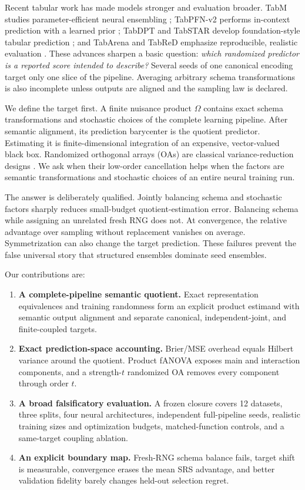 \documentclass{article}
\begin{document}
Recent tabular work has made models stronger and evaluation broader. TabM
studies parameter-efficient neural ensembling \citep{gorishniy2025tabm};
TabPFN-v2 performs in-context prediction with a learned prior
\citep{hollmann2025tabpfn}; TabDPT and TabSTAR develop foundation-style
tabular prediction \citep{ma2025tabdpt,arazi2025tabstar}; and TabArena and
TabReD emphasize reproducible, realistic evaluation
\citep{erickson2025tabarena,rubachev2025tabred}. These advances sharpen a
basic question: \emph{which randomized predictor is a reported score intended
to describe?} Several seeds of one canonical encoding target only one slice
of the pipeline. Averaging arbitrary schema transformations is also incomplete
unless outputs are aligned and the sampling law is declared.

We define the target first. A finite nuisance product $\Omega$ contains exact
schema transformations and stochastic choices of the complete learning
pipeline. After semantic alignment, its prediction barycenter is the quotient
predictor. Estimating it is finite-dimensional integration of an expensive,
vector-valued black box. Randomized orthogonal arrays (OAs) are classical
variance-reduction designs \citep{owen1992oa,ai2016oa}. We ask when their
low-order cancellation helps when the factors are semantic transformations
and stochastic choices of an entire neural training run.

The answer is deliberately qualified. Jointly balancing schema and stochastic
factors sharply reduces small-budget quotient-estimation error. Balancing
schema while assigning an unrelated fresh RNG does not. At convergence, the
relative advantage over sampling without replacement vanishes on average.
Symmetrization can also change the target prediction. These failures prevent
the false universal story that structured ensembles dominate seed ensembles.

Our contributions are:
\begin{enumerate}
  \item \textbf{A complete-pipeline semantic quotient.} Exact representation
  equivalences and training randomness form an explicit product estimand with
  semantic output alignment and separate canonical, independent-joint, and
  finite-coupled targets.
  \item \textbf{Exact prediction-space accounting.} Brier/MSE overhead equals
  Hilbert variance around the quotient. Product fANOVA exposes main and
  interaction components, and a strength-$t$ randomized OA removes every
  component through order $t$.
  \item \textbf{A broad falsificatory evaluation.} A frozen closure covers 12
  datasets, three splits, four neural architectures, independent
  full-pipeline seeds, realistic training sizes and optimization budgets,
  matched-function controls, and a same-target coupling ablation.
  \item \textbf{An explicit boundary map.} Fresh-RNG schema balance fails,
  target shift is measurable, convergence erases the mean SRS advantage, and
  better validation fidelity barely changes held-out selection regret.
\end{enumerate}
\end{document}

